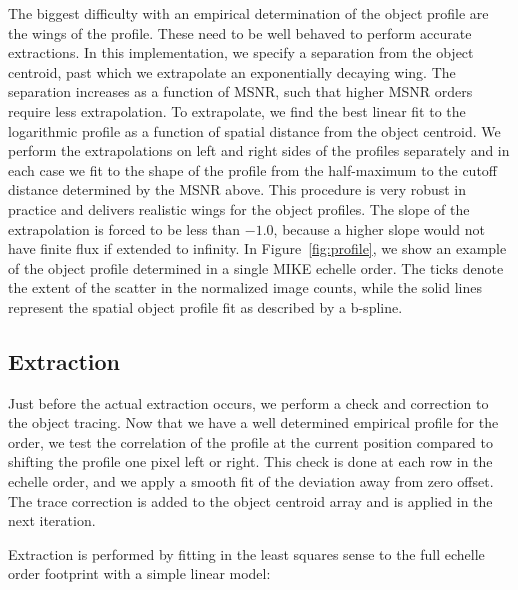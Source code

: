 \documentclass[12pt,preprint]{aastex}
\begin{document}
The biggest difficulty with an empirical determination of the object profile 
are the wings of the profile.  These need to be well behaved to perform
accurate extractions.  In this implementation, we specify a separation from the
object centroid, past which we extrapolate an exponentially decaying wing.
The separation increases as a function of MSNR, such that higher MSNR orders
require less extrapolation.  To extrapolate, we find the best linear fit
to the logarithmic profile as a function of spatial distance 
from the object centroid.
We perform the extrapolations on left and right sides of the profiles 
separately and in each case we fit to the shape of the profile from the 
half-maximum to the cutoff distance determined by the MSNR above.
This procedure is very robust in practice and delivers realistic wings for
the object profiles.  The slope of the extrapolation is forced to be less
than $-1.0$, because a higher slope would not have finite flux if 
extended to infinity.  In Figure~\ref{fig:profile}, we show an example of the
object profile determined in a single MIKE echelle order.  The ticks denote the
extent of the scatter in the normalized image counts, while the solid lines
represent the spatial object profile fit as described by a b-spline.

\subsection{Extraction}

Just before the actual extraction occurs, we perform
a check and correction to the object tracing.
Now that we have a well determined empirical profile for the order, we test
the correlation of the profile at the current position compared to shifting
the profile one pixel left or right.  This check is done at each row in the
echelle order, and we apply a smooth fit of the
deviation away from zero offset.
The trace correction is added to the object centroid array and
is applied in the next iteration.

Extraction is performed by fitting in the least squares sense 
to the full echelle order footprint with a simple linear model:
\end{document}
